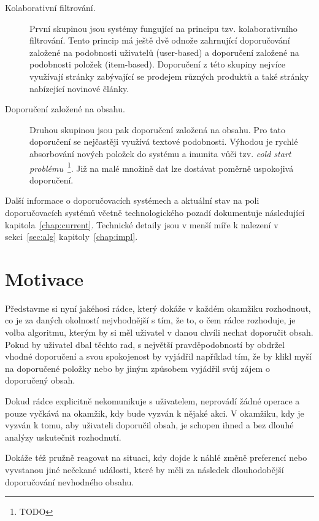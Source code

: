 \documentclass[thesis=M,czech]{FITthesis}[2014/05/07]
\begin{document}
\begin{introduction}
\begin{description}
	\item[Kolaborativní filtrování.] První skupinou jsou systémy fungující na principu tzv. kolaborativního filtrování. Tento princip má ještě dvě odnože zahrnující doporučování založené na podobnosti uživatelů (user-based) a doporučení založené na podobnosti položek (item-based). Doporučení z této skupiny nejvíce využívají stránky zabývající se prodejem různých produktů a také stránky nabízející novinové články.
	\item[Doporučení založené na obsahu.] Druhou skupinou jsou pak doporučení založená na obsahu. Pro tato doporučení se nejčastěji využívá textové podobnosti. Výhodou je rychlé absorbování nových položek do systému a imunita vůči tzv. \emph{cold start problému}~\footnote{TODO}. Již na malé množině dat lze dostávat poměrně uspokojivá doporučení.
\end{description}
 
 Další informace o doporučovacích systémech a aktuální stav na poli doporučovacích systémů včetně technologického pozadí dokumentuje následující kapitola~\ref{chap:current}. Technické detaily jsou v menší míře k nalezení v sekci~\ref{sec:alg} kapitoly~\ref{chap:impl}.

\section{Motivace} 	
\label{sec:motivation}
		
	Představme si nyní jakéhosi rádce, který dokáže v každém okamžiku rozhodnout, co je za daných okolností nejvhodnější s tím, že to, o čem rádce rozhoduje, je volba algoritmu, kterým by si měl uživatel v danou chvíli nechat doporučit obsah. Pokud by uživatel dbal těchto rad, s největší pravděpodobností by obdržel vhodné doporučení a svou spokojenost by vyjádřil například tím, že by klikl myší na doporučené položky nebo by jiným způsobem vyjádřil svůj zájem o doporučený obsah.
	
	Dokud rádce explicitně nekomunikuje s uživatelem, neprovádí žádné operace a pouze vyčkává na okamžik, kdy bude vyzván k nějaké akci. V okamžiku, kdy je vyzván k tomu, aby uživateli doporučil obsah, je schopen ihned a bez dlouhé analýzy uskutečnit rozhodnutí.
	
	Dokáže též pružně reagovat na situaci, kdy dojde k náhlé změně preferencí nebo vyvstanou jiné nečekané události, které by měli za následek dlouhodobější doporučování nevhodného obsahu.
	

\end{introduction}
\end{document}
